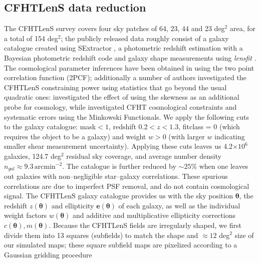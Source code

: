 \documentclass[reprint,aps,prd,superscriptaddress,showkeys,showpacs]{revtex4-1}
\begin{document}
\subsection{CFHTLenS data reduction}
\label{cfhtdatareduction}
%
The CFHTLenS survey covers four sky patches of 64, 23, 44 and 23 deg$^2$ area, for a total of 154 deg$^2$; the publicly released data roughly consist of a galaxy catalogue created using SExtractor \citep{SExtractor}, a photometric redshift estimation with a Bayesian photometric redshift code \citep{PhotoCode} and galaxy shape measurements using \textit{lensfit} \citep{cfht1,cfht2}. The cosmological parameter inferences have been obtained in \citep{CFHTKilbinger} using the two point correlation function (2PCF); additionally a number of authors investigated the CFHTLenS constraining power using statistics that go beyond the usual quadratic ones: \citep{CFHTFu} investigated the effect of using the skewness as an additional probe for cosmology, while \citep{CFHTMasato} investigated CFHT cosmological constraints and systematic errors using the Minkowski Functionals. We apply the following cuts to the galaxy catalogue: mask$<1$, redshift $0.2 < z < 1.3$, fitclass = 0 (which requires the object to be a galaxy) and weight $w>0$ (with larger $w$ indicating smaller shear measurement uncertainty). Applying these cuts leaves us 4.2$\times10^6$ galaxies, 124.7 deg$^2$ residual sky coverage, and average number density $n_{gal} \approx 9.3\,\mathrm{arcmin}^{-2}$. The catalogue is further reduced by $\sim25\%$ when one leaves out galaxies with non--negligible star--galaxy correlations. These spurious correlations are due to imperfect PSF removal, and do not contain cosmological signal. The CFHTLenS galaxy catalogue provides us with the sky position $\pmb{\theta}$, the redshift $z(\pmb{\theta})$ and ellipticity $\mathbf{e}(\pmb{\theta})$ of each galaxy, as well as the individual weight factors $w(\pmb{\theta})$ and additive and multiplicative ellipticity corrections $c(\pmb{\theta}),m(\pmb{\theta})$. Because the CFHTLenS fields are irregularly shaped, we first divide them into 13 squares (subfields) to match the shape and $\approx12$ deg$^2$ size of our simulated maps; these square subfield maps are pixelized according to a Gaussian gridding procedure
\end{document}
